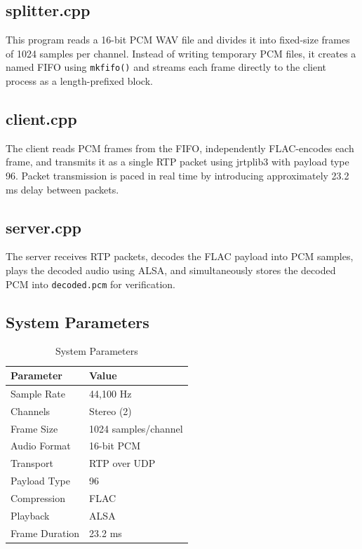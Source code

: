 \documentclass[conference]{IEEEtran}
\begin{document}
\subsection{splitter.cpp}

This program reads a 16-bit PCM WAV file and divides it into fixed-size frames of 1024 samples per channel. Instead of writing temporary PCM files, it creates a named FIFO using \texttt{mkfifo()} and streams each frame directly to the client process as a length-prefixed block.

\subsection{client.cpp}

The client reads PCM frames from the FIFO, independently FLAC-encodes each frame, and transmits it as a single RTP packet using jrtplib3 with payload type 96. Packet transmission is paced in real time by introducing approximately 23.2 ms delay between packets.

\subsection{server.cpp}

The server receives RTP packets, decodes the FLAC payload into PCM samples, plays the decoded audio using ALSA, and simultaneously stores the decoded PCM into \texttt{decoded.pcm} for verification.

\subsection{System Parameters}

\begin{table}[h]
\centering
\caption{System Parameters}
\begin{tabular}{|l|l|}
\hline
Parameter & Value\\
\hline
Sample Rate & 44,100 Hz\\
Channels & Stereo (2)\\
Frame Size & 1024 samples/channel\\
Audio Format & 16-bit PCM\\
Transport & RTP over UDP\\
Payload Type & 96\\
Compression & FLAC\\
Playback & ALSA\\
Frame Duration & 23.2 ms\\
\hline
\end{tabular}
\end{table}
\end{document}

